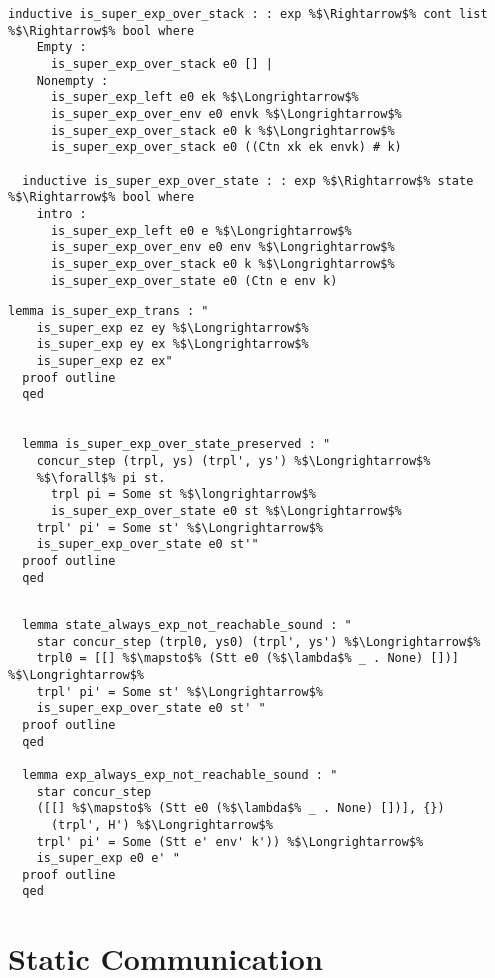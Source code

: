 \documentclass{article}
\begin{document}
\begin{lstlisting}[style=codestyle1, escapechar=\%]
  inductive is_super_exp_over_stack : : exp %$\Rightarrow$% cont list %$\Rightarrow$% bool where
    Empty :
      is_super_exp_over_stack e0 [] |
    Nonempty :
      is_super_exp_left e0 ek %$\Longrightarrow$%
      is_super_exp_over_env e0 envk %$\Longrightarrow$%
      is_super_exp_over_stack e0 k %$\Longrightarrow$%
      is_super_exp_over_stack e0 ((Ctn xk ek envk) # k)

  inductive is_super_exp_over_state : : exp %$\Rightarrow$% state %$\Rightarrow$% bool where
    intro :
      is_super_exp_left e0 e %$\Longrightarrow$%
      is_super_exp_over_env e0 env %$\Longrightarrow$%
      is_super_exp_over_stack e0 k %$\Longrightarrow$%
      is_super_exp_over_state e0 (Ctn e env k)

  \end{lstlisting}

\begin{lstlisting}[style=codestyle1, escapechar=\%]
  lemma is_super_exp_trans : "
    is_super_exp ez ey %$\Longrightarrow$%
    is_super_exp ey ex %$\Longrightarrow$%
    is_super_exp ez ex"
  proof outline 
  qed


  lemma is_super_exp_over_state_preserved : "
    concur_step (trpl, ys) (trpl', ys') %$\Longrightarrow$%
    %$\forall$% pi st.
      trpl pi = Some st %$\longrightarrow$%
      is_super_exp_over_state e0 st %$\Longrightarrow$%
    trpl' pi' = Some st' %$\Longrightarrow$%
    is_super_exp_over_state e0 st'"
  proof outline 
  qed
  \end{lstlisting}


\begin{lstlisting}[style=codestyle1, escapechar=\%]

  lemma state_always_exp_not_reachable_sound : "
    star concur_step (trpl0, ys0) (trpl', ys') %$\Longrightarrow$%
    trpl0 = [[] %$\mapsto$% (Stt e0 (%$\lambda$% _ . None) [])] %$\Longrightarrow$%
    trpl' pi' = Some st' %$\Longrightarrow$%
    is_super_exp_over_state e0 st' "
  proof outline
  qed

  lemma exp_always_exp_not_reachable_sound : "
    star concur_step
    ([[] %$\mapsto$% (Stt e0 (%$\lambda$% _ . None) [])], {})
      (trpl', H') %$\Longrightarrow$%
    trpl' pi' = Some (Stt e' env' k')) %$\Longrightarrow$%
    is_super_exp e0 e' " 
  proof outline
  qed

  \end{lstlisting}

\section{Static Communication}
\begin{lstlisting}[style=codestyle1, escapechar=\%]

  

  \end{lstlisting}
\end{document}
